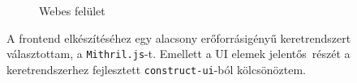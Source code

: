 \begin{figure}[H]
	\centering
	\qquad
	\caption{Webes felület}%
	\label{fig:webui}%
\end{figure}

A frontend elkészítéséhez egy alacsony erőforrásigényű keretrendszert választottam, a \texttt{Mithril.js}-t. Emellett a UI elemek jelentős részét a keretrendszerhez fejlesztett \texttt{construct-ui}-ból kölcsönöztem.
